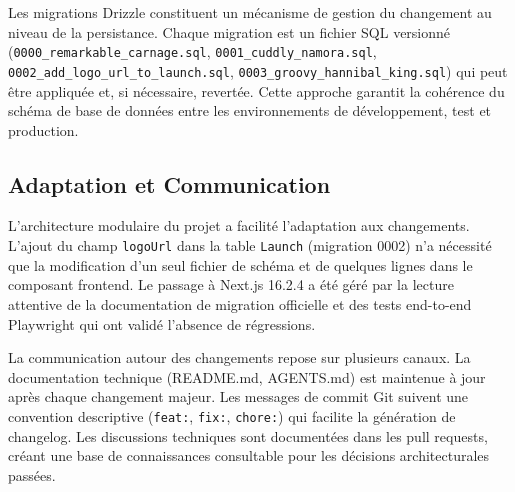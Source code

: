 Les migrations Drizzle constituent un mécanisme de gestion du changement au niveau de la persistance. Chaque migration est un fichier SQL versionné (\texttt{0000\_remarkable\_carnage.sql}, \texttt{0001\_cuddly\_namora.sql}, \texttt{0002\_add\_logo\_url\_to\_launch.sql}, \texttt{0003\_groovy\_hannibal\_king.sql}) qui peut être appliquée et, si nécessaire, revertée. Cette approche garantit la cohérence du schéma de base de données entre les environnements de développement, test et production.



\subsection{Adaptation et Communication}



L'architecture modulaire du projet a facilité l'adaptation aux changements. L'ajout du champ \texttt{logoUrl} dans la table \texttt{Launch} (migration 0002) n'a nécessité que la modification d'un seul fichier de schéma et de quelques lignes dans le composant frontend. Le passage à Next.js 16.2.4 a été géré par la lecture attentive de la documentation de migration officielle et des tests end-to-end Playwright qui ont validé l'absence de régressions.



La communication autour des changements repose sur plusieurs canaux. La documentation technique (README.md, AGENTS.md) est maintenue à jour après chaque changement majeur. Les messages de commit Git suivent une convention descriptive (\texttt{feat:}, \texttt{fix:}, \texttt{chore:}) qui facilite la génération de changelog. Les discussions techniques sont documentées dans les pull requests, créant une base de connaissances consultable pour les décisions architecturales passées.

